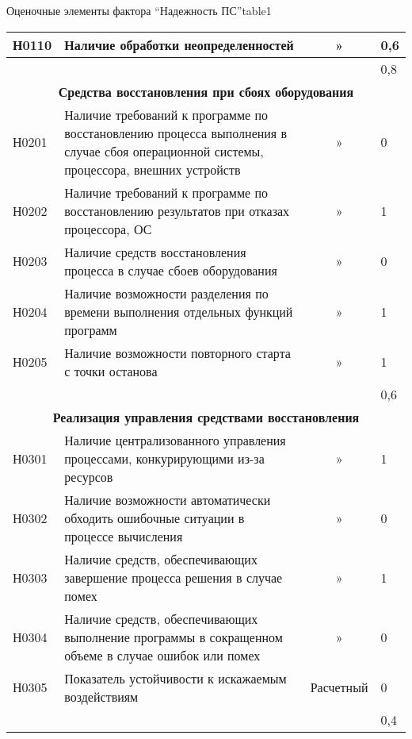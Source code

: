 \begin{ztable}{Оценочные элементы фактора “Надежность ПС”}{table1}
\begin{tabularx}{\textwidth}{|l|X|c|l|}
    \hline
    Н0110 & Наличие обработки неоп­ределенностей & » & 0,6 \\

    \hline
    &&& 0,8 \\

    \hline
    \multicolumn{4}{|c|}{\textbf{Средства восстановления при сбоях оборудования}} \\

    \hline
    Н0201 & Наличие требований к программе по восстановле­нию процесса выполнения в случае сбоя операцион­ной системы, процессора, внешних устройств & » & 0 \\

    \hline
    Н0202 & Наличие требований к программе по восстановле­нию результатов при отка­зах процессора, ОС & » & 1 \\

    \hline
    Н0203 & Наличие средств восста­новления процесса в слу­чае сбоев оборудования & » & 0 \\

    \hline
    Н0204 & Наличие возможности разделения по времени вы­полнения отдельных функ­ций программ & » & 1 \\

    \hline
    Н0205 & Наличие возможности повторного старта с точки останова & » & 1 \\

    \hline
    &&& 0,6 \\

    \hline
    \multicolumn{4}{|c|}{\textbf{Реализация управления средствами восстановления}} \\

    \hline
    Н0301  & Наличие централизован­ного управления процесса­ми, конкурирующими из-за ресурсов & » & 1 \\

    \hline
    Н0302  & Наличие возможности ав­томатически обходить оши­бочные ситуации в процессе вычисления & » & 0 \\

    \hline
    Н0303 & Наличие средств, обеспечивающих завершение про­цесса решения в случае по­мех & » & 1 \\

    \hline
    Н0304  & Наличие средств, обеспе­чивающих выполнение про­граммы в сокращенном объеме в случае ошибок или помех & » & 0 \\

    \hline
    Н0305 & Показатель устойчивости к искажаемым воздействи­ям& Расчетный & 0 \\

    \hline
    &&& 0,4 \\



    \hline
  \end{tabularx}
\end{ztable}
